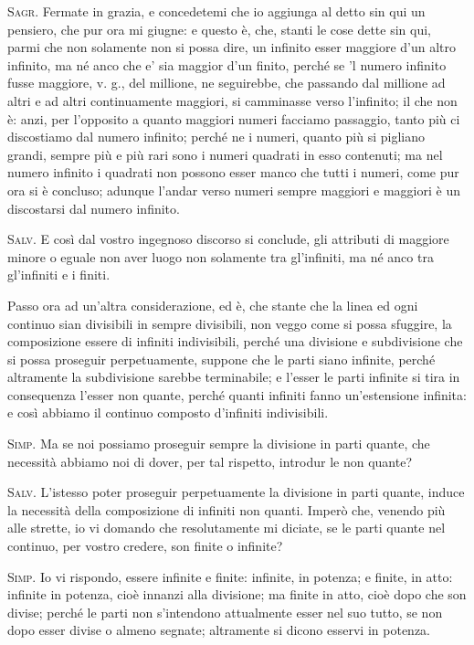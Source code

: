 \documentclass[11pt,twoside,openany]{book}
\newcommand{\speaker}[1]{\textcolor{rubric}{\textsc{#1}}\space}
\begin{document}
\speaker{Sagr.} Fermate in grazia, e concedetemi che io aggiunga al detto sin qui un pensiero, che pur ora mi giugne: e questo è, che, stanti le cose dette sin qui, parmi che non solamente non si possa dire, un infinito esser maggiore d'un altro infinito, ma né anco che e' sia maggior d'un finito, perché se 'l numero infinito fusse maggiore, v. g., del millione, ne seguirebbe, che passando dal millione ad altri e ad altri continuamente maggiori, si camminasse verso l'infinito; il che non è: anzi, per l'opposito a quanto maggiori numeri facciamo passaggio, tanto più ci discostiamo dal numero infinito; perché ne i numeri, quanto più si pigliano grandi, sempre più e più rari sono i numeri quadrati in esso contenuti; ma nel numero infinito i quadrati non possono esser manco che tutti i numeri, come pur ora si è concluso; adunque l'andar verso numeri sempre maggiori e maggiori è un discostarsi dal numero infinito.

\speaker{Salv.} E così dal vostro ingegnoso discorso si conclude, gli attributi di maggiore minore o eguale non aver luogo non solamente tra gl'infiniti, ma né anco tra gl'infiniti e i finiti.

Passo ora ad un'altra considerazione, ed è, che stante che la linea ed ogni continuo sian divisibili in sempre divisibili, non veggo come si possa sfuggire, la composizione essere di infiniti indivisibili, perché una divisione e subdivisione che si possa proseguir perpetuamente, suppone che le parti siano infinite, perché altramente la subdivisione sarebbe terminabile; e l'esser le parti infinite si tira in consequenza l'esser non quante, perché quanti infiniti fanno un'estensione infinita: e così abbiamo il continuo composto d'infiniti indivisibili.

\speaker{Simp.} Ma se noi possiamo proseguir sempre la divisione in parti quante, che necessità abbiamo noi di dover, per tal rispetto, introdur le non quante?

\speaker{Salv.} L'istesso poter proseguir perpetuamente la divisione in parti quante, induce la necessità della composizione di infiniti non quanti. Imperò che, venendo più alle strette, io vi domando che resolutamente mi diciate, se le parti quante nel continuo, per vostro credere, son finite o infinite?

\speaker{Simp.} Io vi rispondo, essere infinite e finite: infinite, in potenza; e finite, in atto: infinite in potenza, cioè innanzi alla divisione; ma finite in atto, cioè dopo che son divise; perché le parti non s'intendono attualmente esser nel suo tutto, se non dopo esser divise o almeno segnate; altramente si dicono esservi in potenza.
\end{document}
